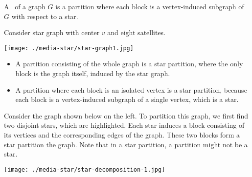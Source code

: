 \begin{group}
\begin{definition}
A~ of a graph $G$ is a partition where each block
is a vertex-induced subgraph of $G$ with respect to a star.
\end{definition}

\begin{example}
\label{ex:graphcon::star-partition}
Consider star graph with center $v$ and eight satellites.
  \begin{center}
  \texttt{[image: ./media-star/star-graph1.jpg]}
  \end{center}

\begin{itemize}
\item A partition consisting of the whole graph is a star partition, where 
the only block is the graph itself, induced by the star graph.

\item A partition where each block is an isolated vertex is a star
  partition, because each block is a vertex-induced subgraph of a
  single vertex, which is a star.
\end{itemize}

\end{example}


\begin{example}
\label{ex:graphcon::star-partition-2}

Consider the graph shown below on the left.
%
To partition this graph, we first find two disjoint stars, which are
highlighted.
%
Each star induces a block consisting of its vertices and the
corresponding edges of the graph.
%
These two blocks form a star partition the graph.
%
Note that in a star partition, a partition might not be a star.
\begin{center}
\texttt{[image: ./media-star/star-decomposition-1.jpg]}
\end{center}
\end{example}
\end{group}


